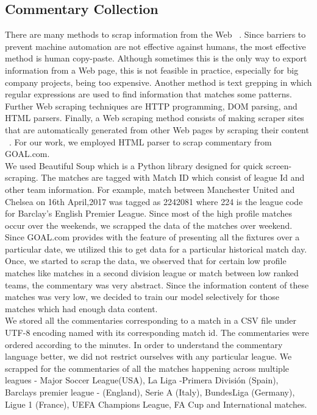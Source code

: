 \documentclass[11pt,letterpaper]{article}
\begin{document}
\subsection{Commentary Collection}
There are many methods to scrap
information from the Web ~\cite{mehlfuhrer2009web}. Since barriers to prevent machine automation are not effective against humans, the most
effective method is human copy-paste. Although sometimes this is the only way to export information from a Web page,
this is not feasible in practice, especially for big company projects, being too expensive. Another method is text grepping
in which regular expressions are used to find information that matches some patterns. Further Web scraping techniques are
HTTP programming, DOM parsing, and HTML parsers. Finally, a Web scraping method consists of making scraper sites
that are automatically generated from other Web pages by scraping their content ~\cite{penman2009web}. For our work, we employed HTML parser to scrap commentary from GOAL.com.\\
We used Beautiful Soup which is a Python library designed for quick screen-scraping. The matches are tagged with Match ID which consist of league Id and other team information. For example, match between Manchester United and Chelsea on 16th April,2017 was tagged as 2242081 where 224 is the league code for Barclay's English Premier League. Since most of the high profile matches occur over the weekends, we scrapped the data of the matches over weekend. Since GOAL.com provides with the feature of presenting all the fixtures over a particular date, we utilized this to get data for a particular historical match day.\\
Once, we started to scrap the data, we observed that for certain low profile matches like matches in  a  second division league or match between low ranked teams, the commentary was very abstract. Since the information content of these matches was very low, we decided to train our model selectively for those matches which had enough data content. \\
We stored all the commentaries corresponding to a match in a CSV file under UTF-8 encoding named with its corresponding match id. The commentaries were ordered according to the minutes.  In order to understand the commentary language better, we did not restrict ourselves with any particular league. We scrapped for the commentaries of all the matches happening across multiple leagues - Major Soccer League(USA), La Liga -Primera División  (Spain), Barclays premier league - (England), Serie A (Italy), BundesLiga (Germany), Ligue 1 (France), UEFA Champions League, FA Cup and International matches.
\end{document}
